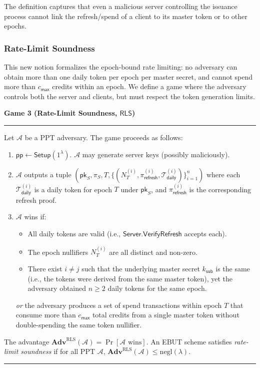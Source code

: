 \documentclass[11pt]{article}
\theoremstyle{definitionstyle}
\theoremstyle{plain}
\newenvironment{game}[2][]
  {\par\addvspace{\topsep}\noindent\textbf{Game #2}\ #1\par\nobreak\smallskip\hrule\smallskip}
  {\hrule\par\addvspace{\topsep}}
\newcommand{\advantage}[1]{\mathbf{Adv}^{\mathrm{#1}}}
\newcommand{\negl}{\mathrm{negl}}
\begin{document}
\noindent The definition captures that even a malicious server controlling the issuance process cannot link the refresh/spend of a client to its master token or to other epochs.

\subsubsection{Rate-Limit Soundness}
This new notion formalizes the epoch-bound rate limiting: no adversary can obtain more than one daily token per epoch per master secret, and cannot spend more than $c_{\mathsf{max}}$ credits within an epoch. We define a game where the adversary controls both the server and clients, but must respect the token generation limits.

\begin{game}{3 (Rate-Limit Soundness, $\mathsf{RLS}$)}
Let $\mathcal{A}$ be a PPT adversary. The game proceeds as follows:
\begin{enumerate}[leftmargin=*]
\item $\mathsf{pp} \leftarrow \mathsf{Setup}(1^\lambda)$. $\mathcal{A}$ may generate server keys (possibly maliciously).
\item $\mathcal{A}$ outputs a tuple $(\mathsf{pk}_S, \pi_S, T, \{(N_T^{(i)}, \pi_{\mathsf{refresh}}^{(i)}, \mathcal{T}_{\mathsf{daily}}^{(i)})\}_{i=1}^n)$ where each $\mathcal{T}_{\mathsf{daily}}^{(i)}$ is a daily token for epoch $T$ under $\mathsf{pk}_S$, and $\pi_{\mathsf{refresh}}^{(i)}$ is the corresponding refresh proof.
\item $\mathcal{A}$ wins if:
  \begin{itemize}
  \item All daily tokens are valid (i.e., $\mathsf{Server.VerifyRefresh}$ accepts each).
  \item The epoch nullifiers $N_T^{(i)}$ are all distinct and non-zero.
  \item There exist $i \neq j$ such that the underlying master secret $k_{\mathsf{sub}}$ is the same (i.e., the tokens were derived from the same master token), yet the adversary obtained $n \ge 2$ daily tokens for the same epoch.
  \end{itemize}
  \emph{or} the adversary produces a set of spend transactions within epoch $T$ that consume more than $c_{\mathsf{max}}$ total credits from a single master token without double-spending the same token nullifier.
\end{enumerate}
The advantage $\advantage{RLS}(\mathcal{A}) = \Pr[\mathcal{A} \text{ wins}]$. An EBUT scheme satisfies \emph{rate-limit soundness} if for all PPT $\mathcal{A}$, $\advantage{RLS}(\mathcal{A}) \le \negl(\lambda)$.
\end{game}
\end{document}
